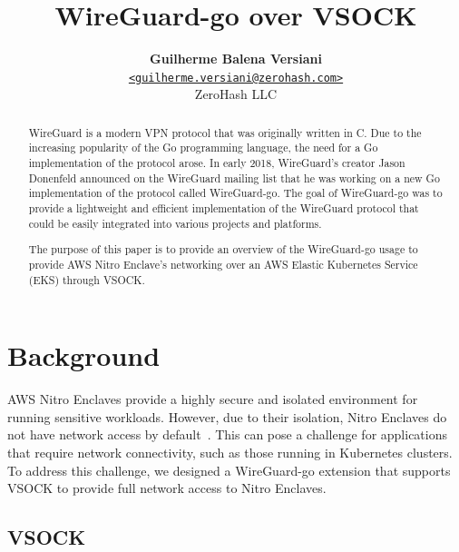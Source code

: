 \documentclass[a4paper, twocolumn]{article}
\title{\vspace{-1.5em}\textbf{WireGuard-go over VSOCK}}
\author{{\textbf{Guilherme Balena Versiani}} \\
        {\href{mailto:guilherme.versiani@zerohash.com}
        {\texttt{<guilherme.versiani@zerohash.com>}}} \\
        {ZeroHash LLC}}
\begin{document}
\maketitle

\begin{@twocolumnfalse}
\begin{abstract}

WireGuard is a modern VPN protocol that was originally written in C. Due to
the increasing popularity of the Go programming language, the need for a Go
implementation of the protocol arose. In early 2018, WireGuard's creator
Jason Donenfeld announced on the WireGuard mailing list that he was working
on a new Go implementation of the protocol called WireGuard-go. The goal of
WireGuard-go was to provide a lightweight and efficient implementation of the
WireGuard protocol that could be easily integrated into various projects and
platforms.

The purpose of this paper is to provide an overview of the WireGuard-go usage
to provide AWS Nitro Enclave's networking over an AWS Elastic Kubernetes
Service (EKS) through VSOCK.\@

\end{abstract}
\end{@twocolumnfalse}

\section{Background}\label{sec:introduction}

AWS Nitro Enclaves provide a highly secure and isolated environment for running
sensitive workloads. However, due to their isolation, Nitro Enclaves do not
have network access by default~\cite{amazon_2023}. This can pose a challenge for
applications that require network connectivity, such as those running in
Kubernetes clusters. To address this challenge, we designed a WireGuard-go
extension that supports VSOCK to provide full network access to Nitro Enclaves.

\subsection{VSOCK}\label{sec:vsock}
\end{document}

